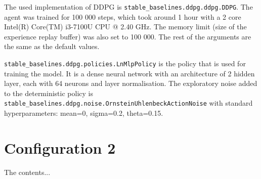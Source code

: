 \documentclass[class=book, crop=false, 11pt]{standalone}
\begin{document}
The used implementation of DDPG is \texttt{stable\_baselines.ddpg.ddpg.DDPG}. The agent was trained for 100 000 steps, which took around 1 hour with a 2 core Intel(R) Core(TM) i3-7100U CPU @ 2.40 GHz. The memory limit (size of the experience replay buffer) was also set to 100 000. The rest of the arguments are the same as the default values. 

\texttt{stable\_baselines.ddpg.policies.LnMlpPolicy} is the policy that is used for training the model. It is a dense neural network with an architecture of 2 hidden layer, each with 64 neurons and layer normalisation. The exploratory noise added to the deterministic policy is \texttt{stable\_baselines.ddpg.noise.OrnsteinUhlenbeckActionNoise} with standard hyperparameters: mean=0, sigma=0.2, theta=0.15.  


\section{Configuration 2}
The contents...
\end{document}
